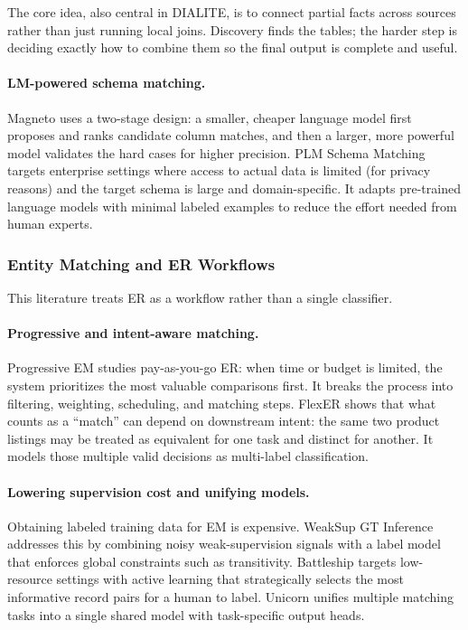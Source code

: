 \documentclass[sigconf]{acmart}
\begin{document}
The core idea, also central in DIALITE, is to connect partial facts across sources rather than just running local joins. Discovery finds the tables; the harder step is deciding exactly how to combine them so the final output is complete and useful.

\paragraph{LM-powered schema matching.}
Magneto uses a two-stage design: a smaller, cheaper language model first proposes and ranks candidate column matches, and then a larger, more powerful model validates the hard cases for higher precision. PLM Schema Matching targets enterprise settings where access to actual data is limited (for privacy reasons) and the target schema is large and domain-specific. It adapts pre-trained language models with minimal labeled examples to reduce the effort needed from human experts.


\subsubsection{Entity Matching and ER Workflows}

This literature treats ER as a workflow rather than a single classifier.

\paragraph{Progressive and intent-aware matching.}
Progressive EM studies pay-as-you-go ER: when time or budget is limited, the system prioritizes the most valuable comparisons first. It breaks the process into filtering, weighting, scheduling, and matching steps. FlexER shows that what counts as a ``match'' can depend on downstream intent: the same two product listings may be treated as equivalent for one task and distinct for another. It models those multiple valid decisions as multi-label classification.

\paragraph{Lowering supervision cost and unifying models.}
Obtaining labeled training data for EM is expensive. WeakSup GT Inference addresses this by combining noisy weak-supervision signals with a label model that enforces global constraints such as transitivity. Battleship targets low-resource settings with active learning that strategically selects the most informative record pairs for a human to label. Unicorn unifies multiple matching tasks into a single shared model with task-specific output heads.
\end{document}
